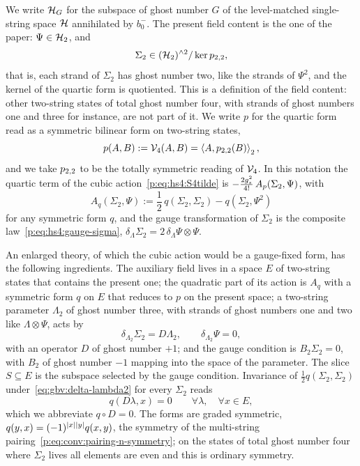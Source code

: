 We write $\Hs_G$ for the subspace of ghost number $G$ of the level-matched single-string space $\Hs$ annihilated by $b_0^-$.
The present field content is the one of the paper: $\Psi \in \Hs_2$, and
\begin{equation}
  \label{eq:gbv:present-content}
  \Sigma_2
    \in (\Hs_2)^{\wedge 2} / \ker \sprod{2}{2},
\end{equation}
that is, each strand of $\Sigma_2$ has ghost number two, like the strands of $\Psi^2$, and the kernel of the quartic form is quotiented.
This is a definition of the field content: other two-string states of total ghost number four, with strands of ghost numbers one and three for instance, are not part of it.
We write $p$ for the quartic form read as a symmetric bilinear form on two-string states,
\begin{equation}
  \label{eq:gbv:p}
  p(A, B)
    := \vertex{4}(A, B)
    = \pair[2]{A}{\sprod{2}{2}(B)},
\end{equation}
and we take $\sprod{2}{2}$ to be the totally symmetric reading of $\vertex{4}$.
In this notation the quartic term of the cubic action~\eqref{p:eq:hs4:S4tilde} is $- \tfrac{2 \gs^2}{4!} \, A_p(\Sigma_2, \Psi)$, with
\begin{equation}
  \label{eq:gbv:quadratic-part}
  A_q(\Sigma_2, \Psi)
    := \frac{1}{2} \, q(\Sigma_2, \Sigma_2)
      - q(\Sigma_2, \Psi^2)
\end{equation}
for any symmetric form $q$, and the gauge transformation of $\Sigma_2$ is the composite law~\eqref{p:eq:hs4:gauge-sigma}, $\delta_\Lambda \Sigma_2 = 2 \, \delta_\Lambda \Psi \otimes \Psi$.

An enlarged theory, of which the cubic action would be a gauge-fixed form, has the following ingredients.
The auxiliary field lives in a space $E$ of two-string states that contains the present one; the quadratic part of its action is $A_q$ with a symmetric form $q$ on $E$ that reduces to $p$ on the present space; a two-string parameter $\Lambda_2$ of ghost number three, with strands of ghost numbers one and two like $\Lambda \otimes \Psi$, acts by
\begin{equation}
  \label{eq:gbv:delta-lambda2}
  \delta_{\Lambda_2} \Sigma_2
    = D \Lambda_2,
  \qquad
  \delta_{\Lambda_2} \Psi
    = 0,
\end{equation}
with an operator $D$ of ghost number $+1$; and the gauge condition is $B_2 \Sigma_2 = 0$, with $B_2$ of ghost number $-1$ mapping into the space of the parameter.
The slice $S \subseteq E$ is the subspace selected by the gauge condition.
Invariance of $\tfrac12 q(\Sigma_2, \Sigma_2)$ under~\eqref{eq:gbv:delta-lambda2} for every $\Sigma_2$ reads
\begin{equation}
  \label{eq:gbv:invariance}
  q(D \lambda, x)
    = 0
  \qquad
  \forall \lambda,
  \quad
  \forall x \in E,
\end{equation}
which we abbreviate $q \circ D = 0$.
The forms are graded symmetric, $q(y, x) = (-1)^{\abs{x} \abs{y}} q(x, y)$, the symmetry of the multi-string pairing~\eqref{p:eq:conv:pairing-n-symmetry}; on the states of total ghost number four where $\Sigma_2$ lives all elements are even and this is ordinary symmetry.

